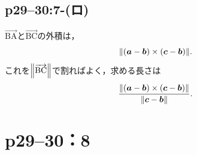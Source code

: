 \documentclass[a4paper,10pt,fleqn]{ltjsarticle}
\begin{document}
\subsection*{p29--30:7-(ロ)}

\begin{tleftbar}
  $ \overrightarrow{\mathrm{BA}}$と$\overrightarrow{\mathrm{BC}}$の外積は，
  \[
    \norm{(\bm{a}-\bm{b})\times(\bm{c}-\bm{b})}.
  \]
  これを$\norm{\overrightarrow{\mathrm{BC}}}$で割ればよく，求める長さは
  \[
    \frac{\norm{(\bm{a}-\bm{b})\times(\bm{c}-\bm{b})}}{\norm{\bm{c}-\bm{b}}}.
  \]
\end{tleftbar}

\section*{p29--30：8}
\end{document}
